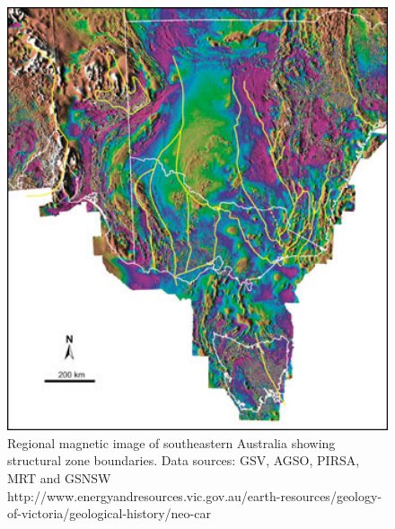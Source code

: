 \documentclass[a4paper]{article}
\begin{document}
\begin{figure}[H]
\centering
\includegraphics[width=1\textwidth]{Geology_Neoproterozoic_Fig_1.jpg}
\caption{\label{fig:mangneticImage}Regional magnetic image of southeastern Australia showing structural zone boundaries. Data sources: GSV, AGSO, PIRSA, MRT and GSNSW http://www.energyandresources.vic.gov.au/earth-resources/geology-of-victoria/geological-history/neo-car}
\end{figure}
\end{document}
